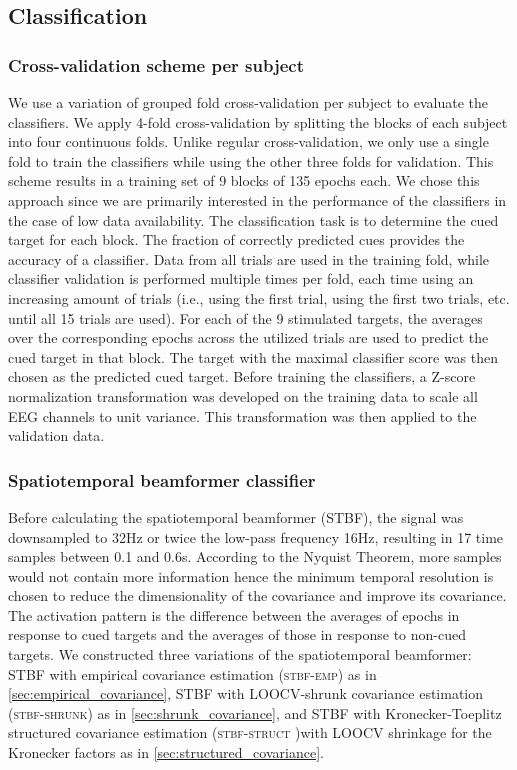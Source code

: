 	\subsection{Classification}
	\subsubsection{Cross-validation scheme per subject}
	We use a variation of grouped fold cross-validation per subject to evaluate the classifiers.
	We apply 4-fold cross-validation by splitting the blocks of each subject into
	four continuous folds.
	Unlike regular cross-validation, we only use a single fold to train the
	classifiers while using the other three folds for validation.
	This scheme results in a training set of 9 blocks of 135 epochs each.
	We chose this approach since we are primarily interested in the performance of the classifiers in the case of low data availability.
	The classification task is to determine the cued target for each block.
	The fraction of correctly predicted cues provides the accuracy of a classifier.
	Data from all trials are used in the training fold, while classifier validation
	is performed multiple times per fold, each time using an increasing amount of
	trials (i.e., using the first trial, using the first two trials, etc. until all 15 trials
	are used).
	For each of the 9 stimulated targets, the averages over the corresponding epochs across
	the utilized trials are used to predict the cued target in that block.
	The target with the maximal classifier score was then chosen as the predicted
	cued target.
	Before training the classifiers, a Z-score normalization transformation was
	developed on the training data to scale all EEG channels to unit variance.
	This transformation was then applied to the validation data.

	\subsubsection{Spatiotemporal beamformer classifier}
	Before calculating the spatiotemporal beamformer (STBF), the signal was downsampled to
	32Hz or twice the low-pass frequency 16Hz, resulting in 17 time samples
	between 0.1 and 0.6s. According to the Nyquist Theorem, more samples would not
	contain more information hence the minimum temporal resolution is chosen to reduce
	the dimensionality of the covariance and improve its covariance.
	The activation pattern is the difference between the averages of epochs in response to cued targets and the averages of those in response to non-cued targets.
	We constructed three variations of the spatiotemporal beamformer:
	STBF with empirical covariance estimation (\textsc{stbf-emp}) as in
	\autoref{sec:empirical_covariance}, STBF with
	LOOCV-shrunk covariance estimation (\textsc{stbf-shrunk}) as in
	\autoref{sec:shrunk_covariance}, and STBF with
	Kronecker-Toeplitz structured covariance estimation (\textsc{stbf-struct} )with LOOCV shrinkage for
	the Kronecker factors as in \autoref{sec:structured_covariance}.

